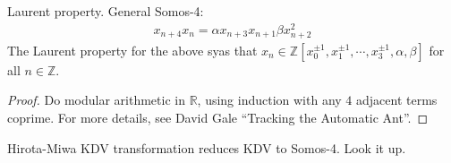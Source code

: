 \documentclass[12pt,reqno]{amsart}
\numberwithin{equation}{section}  %
\newcommand{\rr}{\mathbb{R}}
\newcommand{\zz}{\mathbb{Z}}
\begin{document}
Laurent property. General Somos-4:
%
%
\begin{equation*}
\begin{split}
  x_{n+4}x_{n} = \alpha x_{n+3} x_{n+1} \beta x_{n+2}^{2}
\end{split}
\end{equation*}
%
%
The Laurent property for the above syas that $x_{n} \in \zz[x_{0}^{\pm 1},
x_{1}^{\pm 1}, \cdots, x_{3}^{\pm 1}, \alpha, \beta ]$ for all $n \in \zz$. 
%
%
\begin{proof}
Do modular arithmetic in $\rr$, using induction with any $4$ adjacent terms
coprime. For more details, see David Gale ``Tracking the Automatic Ant''.
\end{proof}
%
%
Hirota-Miwa KDV transformation reduces KDV to Somos-4. Look it up.
%
%
%
%
%
%
%
%
\end{document}
